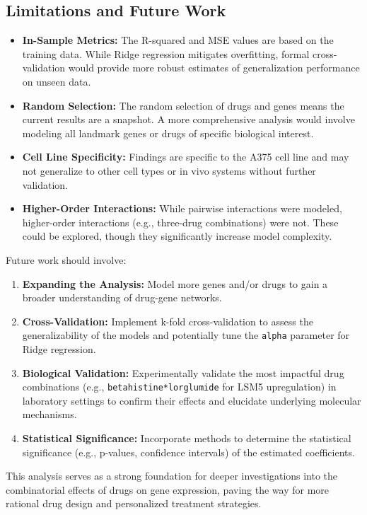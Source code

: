 \documentclass[12pt]{article}
\begin{document}
\subsection{Limitations and Future Work}
\begin{itemize}
    \item \textbf{In-Sample Metrics:} The R-squared and MSE values are based on the training data. While Ridge regression mitigates overfitting, formal cross-validation would provide more robust estimates of generalization performance on unseen data.
    \item \textbf{Random Selection:} The random selection of drugs and genes means the current results are a snapshot. A more comprehensive analysis would involve modeling all landmark genes or drugs of specific biological interest.
    \item \textbf{Cell Line Specificity:} Findings are specific to the A375 cell line and may not generalize to other cell types or in vivo systems without further validation.
    \item \textbf{Higher-Order Interactions:} While pairwise interactions were modeled, higher-order interactions (e.g., three-drug combinations) were not. These could be explored, though they significantly increase model complexity.
\end{itemize}

Future work should involve:
\begin{enumerate}
    \item \textbf{Expanding the Analysis:} Model more genes and/or drugs to gain a broader understanding of drug-gene networks.
    \item \textbf{Cross-Validation:} Implement k-fold cross-validation to assess the generalizability of the models and potentially tune the \texttt{alpha} parameter for Ridge regression.
    \item \textbf{Biological Validation:} Experimentally validate the most impactful drug combinations (e.g., \texttt{betahistine*lorglumide} for LSM5 upregulation) in laboratory settings to confirm their effects and elucidate underlying molecular mechanisms.
    \item \textbf{Statistical Significance:} Incorporate methods to determine the statistical significance (e.g., p-values, confidence intervals) of the estimated coefficients.
\end{enumerate}
This analysis serves as a strong foundation for deeper investigations into the combinatorial effects of drugs on gene expression, paving the way for more rational drug design and personalized treatment strategies.
\end{document}
